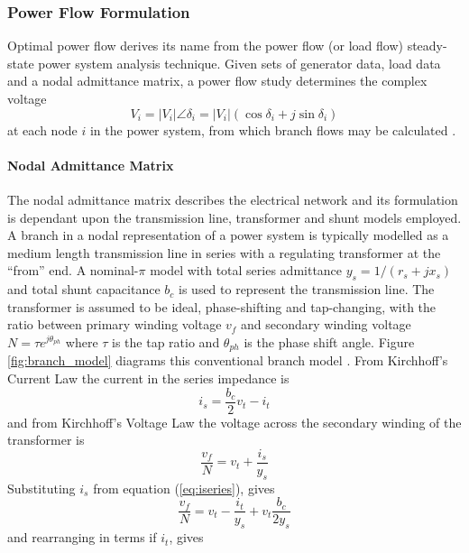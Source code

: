 \subsubsection{Power Flow Formulation}
\label{sec:pf_form}
Optimal power flow derives its name from the power flow (or load flow)
steady-state power system analysis technique.  Given sets of generator data,
load data and a nodal admittance matrix, a power flow study determines the
complex voltage
\begin{equation}
V_i = \vert V_i \vert \angle\delta_i = \vert
V_i\vert(\cos\delta_i + j\sin\delta_i)
\end{equation}
at each node $i$ in the power system, from which branch flows may be calculated
\cite{grainger:psa}.

\paragraph{Nodal Admittance Matrix}
The nodal admittance matrix describes the electrical network and its
formulation is dependant upon the transmission line, transformer and shunt
models employed.  A branch in a nodal representation of a power system is
typically modelled as a medium length transmission line in series with a regulating
transformer at the ``from'' end. A nominal-$\pi$
model with total series admittance $y_s = 1/(r_s+jx_s)$ and total shunt
capacitance $b_c$ is used to represent the transmission line.  The transformer
is assumed to be ideal, phase-shifting and tap-changing, with the ratio between primary winding voltage $v_{f}$ and secondary winding voltage
$N = \tau e^{j\theta_{ph}}$ where $\tau$ is the tap ratio and $\theta_{ph}$ is
the phase shift angle. Figure \ref{fig:branch_model} diagrams this
conventional branch model \cite[p.11]{pserc:mp_manual}.  From Kirchhoff's
Current Law the current in the series impedance is
\begin{equation}
\label{eq:iseries}
i_s = \frac{b_c}{2}v_t - i_t
\end{equation}
and from Kirchhoff's Voltage Law the voltage across the secondary winding of
the transformer is
\begin{equation}
\frac{v_{f}}{N} = v_t + \frac{i_s}{y_s}
\end{equation}
Substituting $i_s$ from equation (\ref{eq:iseries}), gives
\begin{equation}
\label{eq:vfrom}
\frac{v_{f}}{N} = v_t - \frac{i_t}{y_s} + v_t\frac{b_c}{2y_s}
\end{equation}
and rearranging in terms if $i_t$, gives
